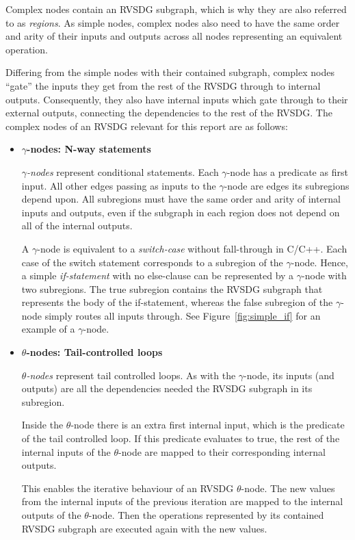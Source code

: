 Complex nodes contain an RVSDG subgraph, which is why they are also referred to
as \textit{regions}. As simple nodes, complex nodes also need to have the same
order and arity of their inputs and outputs across all nodes representing an
equivalent operation.

Differing from the simple nodes with their contained subgraph, complex nodes
``gate'' the inputs they get from the rest of the RVSDG through to internal
outputs. Consequently, they also have internal inputs which gate through
to their external outputs, connecting the dependencies to the rest of the RVSDG.
The complex nodes of an RVSDG relevant for this report are as follows:

\begin{itemize}

\item \textbf{$\gamma$-nodes: N-way statements}

\textit{$\gamma$-nodes} represent conditional statements. Each $\gamma$-node has
a predicate as first input. All other edges passing as inputs to the
$\gamma$-node are edges its subregions depend upon. All subregions must have the
same order and arity of internal inputs and outputs, even if the subgraph in
each region does not depend on all of the internal outputs.

A $\gamma$-node is equivalent to a \textit{switch-case} without fall-through in
C/C++. Each case of the switch statement corresponds to a subregion of the
$\gamma$-node. Hence, a simple \textit{if-statement} with no else-clause can be
represented by a $\gamma$-node with two subregions. The true subregion contains
the RVSDG subgraph that represents the body of the if-statement, whereas the
false subregion of the $\gamma$-node simply routes all inputs through. See
Figure~\ref{fig:simple_if} for an example of a $\gamma$-node.

\item \textbf{$\theta$-nodes: Tail-controlled loops}

\textit{$\theta$-nodes} represent tail controlled loops. As with the
$\gamma$-node, its inputs (and outputs) are all the dependencies needed the
RVSDG subgraph in its subregion.

Inside the $\theta$-node there is an extra first internal input, which is
the predicate of the tail controlled loop. If this predicate evaluates to true,
the rest of the internal inputs of the $\theta$-node are mapped to their
corresponding internal outputs.

This enables the iterative behaviour of an RVSDG $\theta$-node. The new values
from the internal inputs of the previous iteration are mapped to the
internal outputs of the $\theta$-node. Then the operations represented by
its contained RVSDG subgraph are executed again with the new values.


\end{itemize}

